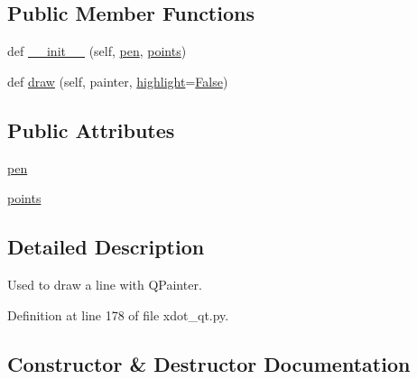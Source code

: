 \subsection*{Public Member Functions}
\begin{DoxyCompactItemize}
\item 
def \hyperlink{classsmacc__viewer_1_1xdot_1_1xdot__qt_1_1LineShape_a9fb873cd37b8ebd5d7590b03bba41ffb}{\+\_\+\+\_\+init\+\_\+\+\_\+} (self, \hyperlink{classsmacc__viewer_1_1xdot_1_1xdot__qt_1_1LineShape_a60b9ba07ca324d8cb3710db7850975b2}{pen}, \hyperlink{classsmacc__viewer_1_1xdot_1_1xdot__qt_1_1LineShape_a815cd548c33d9d5b05f521cd6a9fa1ca}{points})
\item 
def \hyperlink{classsmacc__viewer_1_1xdot_1_1xdot__qt_1_1LineShape_a041baad9cafc4a10da363b4c35bd875a}{draw} (self, painter, \hyperlink{namespacesmacc__viewer_1_1xdot_1_1xdot__qt_ab7970f10809cac5c23ebf9c6badb6d79}{highlight}=\hyperlink{namespacesmacc__viewer_a5928e8da279785cbab9011356c3eaa87}{False})
\end{DoxyCompactItemize}
\subsection*{Public Attributes}
\begin{DoxyCompactItemize}
\item 
\hyperlink{classsmacc__viewer_1_1xdot_1_1xdot__qt_1_1LineShape_a60b9ba07ca324d8cb3710db7850975b2}{pen}
\item 
\hyperlink{classsmacc__viewer_1_1xdot_1_1xdot__qt_1_1LineShape_a815cd548c33d9d5b05f521cd6a9fa1ca}{points}
\end{DoxyCompactItemize}


\subsection{Detailed Description}
\begin{DoxyVerb}Used to draw a line with QPainter.\end{DoxyVerb}
 

Definition at line 178 of file xdot\+\_\+qt.\+py.



\subsection{Constructor \& Destructor Documentation}
